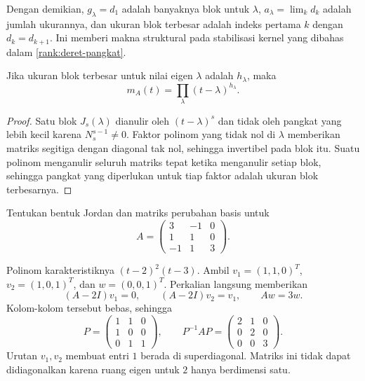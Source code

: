 Dengan demikian, $g_\lambda=d_1$ adalah banyaknya blok untuk $\lambda$,
$a_\lambda=\lim_k d_k$ adalah jumlah ukurannya, dan ukuran blok
terbesar adalah indeks pertama $k$ dengan $d_k=d_{k+1}$.
Ini memberi makna struktural pada stabilisasi kernel yang dibahas
dalam \autoref{rank:deret-pangkat}.

\begin{prop}
    \label{eigen:minimal-jordan}
    Jika ukuran blok terbesar untuk nilai eigen $\lambda$ adalah
    $h_\lambda$, maka
    \[
        m_A(t)=\prod_\lambda(t-\lambda)^{h_\lambda}.
    \]
\end{prop}
\begin{proof}
    Satu blok $J_s(\lambda)$ dianulir oleh $(t-\lambda)^s$
    dan tidak oleh pangkat yang lebih kecil karena $N_s^{s-1}\ne0$.
    Faktor polinom yang tidak nol di $\lambda$ memberikan matriks
    segitiga dengan diagonal tak nol, sehingga invertibel pada blok itu.
    Suatu polinom menganulir seluruh matriks tepat ketika menganulir
    setiap blok, sehingga pangkat yang diperlukan untuk tiap faktor
    adalah ukuran blok terbesarnya.
\end{proof}

\begin{exam}
    Tentukan bentuk Jordan dan matriks perubahan basis untuk
    \[
        A=\begin{pmatrix}3&-1&0\\1&1&0\\-1&1&3\end{pmatrix}.
    \]
\end{exam}
\begin{solution}
    Polinom karakteristiknya $(t-2)^2(t-3)$.
    Ambil $v_1=(1,1,0)^T$, $v_2=(1,0,1)^T$, dan $w=(0,0,1)^T$.
    Perkalian langsung memberikan
    \[
        (A-2I)v_1=0,\qquad (A-2I)v_2=v_1,\qquad Aw=3w.
    \]
    Kolom-kolom tersebut bebas, sehingga
    \[
        P=\begin{pmatrix}1&1&0\\1&0&0\\0&1&1\end{pmatrix},\qquad
        P^{-1}AP=\begin{pmatrix}2&1&0\\0&2&0\\0&0&3\end{pmatrix}.
    \]
    Urutan $v_1,v_2$ membuat entri $1$ berada di superdiagonal.
    Matriks ini tidak dapat didiagonalkan karena ruang eigen untuk $2$
    hanya berdimensi satu.
\end{solution}

